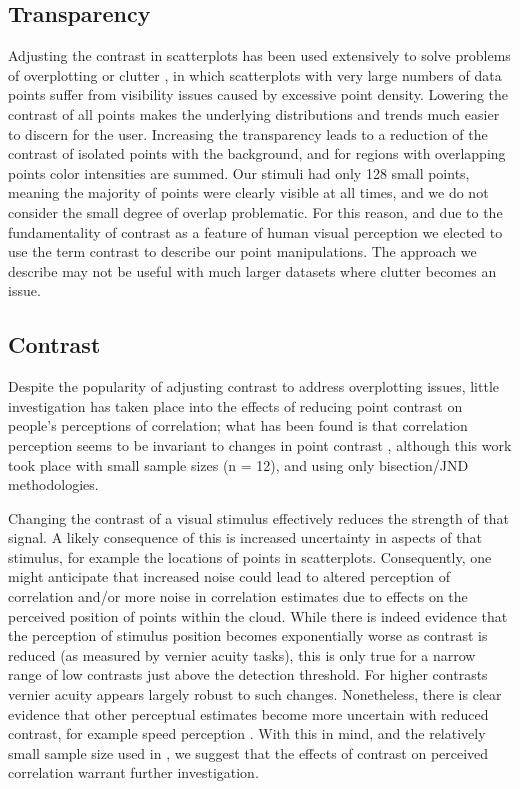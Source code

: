 \documentclass[preprint, 3p,
authoryear]{elsarticle} %
\begin{document}
\hypertarget{transparency}{%
\subsection{Transparency}\label{transparency}}

Adjusting the contrast in scatterplots has been used extensively to
solve problems of overplotting or clutter
\citep{matejka_2015, bertini_2004}, in which scatterplots with very
large numbers of data points suffer from visibility issues caused by
excessive point density. Lowering the contrast of all points makes the
underlying distributions and trends much easier to discern for the user.
Increasing the transparency leads to a reduction of the contrast of
isolated points with the background, and for regions with overlapping
points color intensities are summed. Our stimuli had only 128 small
points, meaning the majority of points were clearly visible at all
times, and we do not consider the small degree of overlap problematic.
For this reason, and due to the fundamentality of contrast as a feature
of human visual perception \citep{ginsburg_2003} we elected to use the
term contrast to describe our point manipulations. The approach we
describe may not be useful with much larger datasets where clutter
becomes an issue.

\hypertarget{contrast}{%
\subsection{Contrast}\label{contrast}}

Despite the popularity of adjusting contrast to address overplotting
issues, little investigation has taken place into the effects of
reducing point contrast on people's perceptions of correlation; what has
been found is that correlation perception seems to be invariant to
changes in point contrast \citep{rensink_2012}, although this work took
place with small sample sizes (n = 12), and using only bisection/JND
methodologies.

Changing the contrast of a visual stimulus effectively reduces the
strength of that signal. A likely consequence of this is increased
uncertainty in aspects of that stimulus, for example the locations of
points in scatterplots. Consequently, one might anticipate that
increased noise could lead to altered perception of correlation and/or
more noise in correlation estimates due to effects on the perceived
position of points within the cloud. While there is indeed evidence
\citep{wehrhahn_1990} that the perception of stimulus position becomes
exponentially worse as contrast is reduced (as measured by vernier
acuity tasks), this is only true for a narrow range of low contrasts
just above the detection threshold. For higher contrasts vernier acuity
appears largely robust to such changes. Nonetheless, there is clear
evidence that other perceptual estimates become more uncertain with
reduced contrast, for example speed perception \citep{champion_2017}.
With this in mind, and the relatively small sample size used in
\citet{rensink_2012}, we suggest that the effects of contrast on
perceived correlation warrant further investigation.
\end{document}
